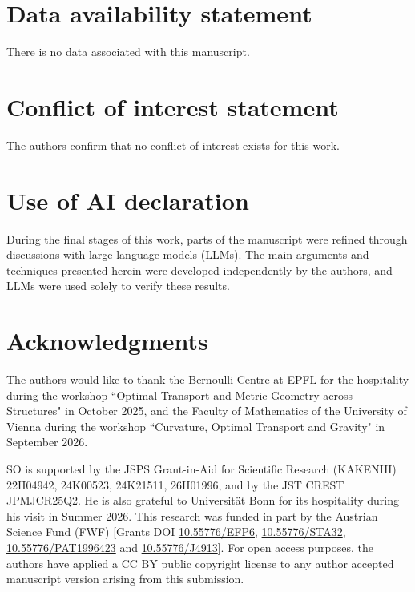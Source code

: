 \documentclass[a4paper,11pt]{article}
\numberwithin{equation}{section}
\theoremstyle{definition}
\theoremstyle{plain}
\begin{document}
\section*{Data availability statement}

There is no data associated with this manuscript.

\section*{Conflict of interest statement}

The authors confirm that no conflict of interest exists for this work.

\section*{Use of AI declaration}

During the final stages of this work, parts of the manuscript were refined through discussions with large language models (LLMs).
The main arguments and techniques presented herein were developed independently by the authors, and LLMs were used solely to verify these results.

\section*{Acknowledgments}

The authors would like to thank the Bernoulli Centre at EPFL for the hospitality during the workshop ``Optimal Transport and Metric Geometry across Structures" in October 2025, and the Faculty of Mathematics of the University of Vienna during the workshop ``Curvature, Optimal Transport and Gravity" in September 2026.

SO is supported by the JSPS Grant-in-Aid for Scientific Research (KAKENHI) 22H04942, 24K00523, 24K21511, 26H01996, and by the JST CREST JPMJCR25Q2. He is also grateful to Universit\"at Bonn for its hospitality during his visit in Summer 2026.
This research was funded in part by the Austrian Science Fund (FWF) [Grants DOI \href{https://doi.org/10.55776/EFP6}{10.55776/EFP6}, \href{https://doi.org/10.55776/STA32}{10.55776/STA32}, \href{https://doi.org/10.55776/PAT1996423}{10.55776/PAT1996423} and \href{https://doi.org/10.55776/J4913}{10.55776/J4913}]. For open access purposes, the authors have applied a CC BY public copyright license to any author accepted manuscript version arising from this submission.

{}
\printbibliography
% 
%

 
\end{document}
